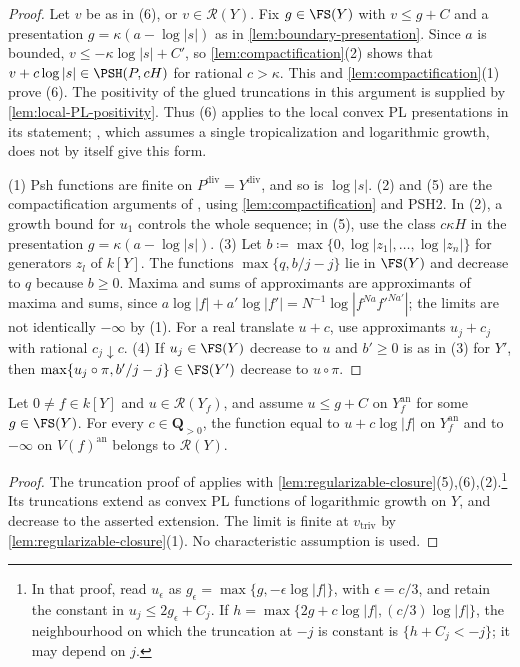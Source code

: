 \documentclass[11pt,a4paper]{article}
\newcommand{\an}{\mathrm{an}}          %
\newcommand{\divv}{\mathrm{div}}       %
\newcommand{\vtriv}{v_{\mathrm{triv}}} %
\begin{document}
\begin{proof}
Let $v$ be as in (6), or $v\in\mathcal{R}(Y)$. Fix $g\in\FS(Y)$ with $v\le g+C$ and a presentation $g=\kappa(a-\log|s|)$ as in \cref{lem:boundary-presentation}. Since $a$ is bounded, $v\le-\kappa\log|s|+C'$, so \cref{lem:compactification}(2) shows that $v+c\log|s|\in\PSH(P,cH)$ for rational $c>\kappa$. This and \cref{lem:compactification}(1) prove (6). The positivity of the glued truncations in this argument is supplied by \cref{lem:local-PL-positivity}. Thus (6) applies to the local convex PL presentations in its statement; \cite[Lemma~3.26]{Wu26}, which assumes a single tropicalization and logarithmic growth, does not by itself give this form.

(1) Psh functions are finite on $P^{\divv}=Y^{\divv}$, and so is $\log|s|$. (2) and (5) are the compactification arguments of \cite[Lemma~3.25(3),(2)]{Wu26}, using \cref{lem:compactification} and PSH2. In (2), a growth bound for $u_1$ controls the whole sequence; in (5), use the class $c\kappa H$ in the presentation $g=\kappa(a-\log|s|)$. (3) Let $b\coloneqq\max\{0,\log|z_1|,\ldots,\log|z_n|\}$ for generators $z_l$ of $k[Y]$. The functions $\max\{q,b/j-j\}$ lie in $\FS(Y)$ and decrease to $q$ because $b\ge0$. Maxima and sums of approximants are approximants of maxima and sums, since $a\log|f|+a'\log|f'|=N^{-1}\log|f^{Na}f'^{Na'}|$; the limits are not identically $-\infty$ by (1). For a real translate $u+c$, use approximants $u_j+c_j$ with rational $c_j\downarrow c$. (4) If $u_j\in\FS(Y)$ decrease to $u$ and $b'\ge0$ is as in (3) for $Y'$, then $\max\{u_j\circ\pi,b'/j-j\}\in\FS(Y')$ decrease to $u\circ\pi$.
\end{proof}

\begin{lemma}\label{lem:principal-extension}
Let $0\ne f\in k[Y]$ and $u\in\mathcal{R}(Y_f)$, and assume $u\le g+C$ on $Y_f^{\an}$ for some $g\in\FS(Y)$. For every $c\in\mathbf Q_{>0}$, the function equal to $u+c\log|f|$ on $Y_f^{\an}$ and to $-\infty$ on $V(f)^{\an}$ belongs to $\mathcal{R}(Y)$.
\end{lemma}

\begin{proof}
The truncation proof of \cite[Proposition~3.30]{Wu26} applies with \cref{lem:regularizable-closure}(5),(6),(2).\footnote{In that proof, read $u_\epsilon$ as $g_\epsilon=\max\{g,-\epsilon\log|f|\}$, with $\epsilon=c/3$, and retain the constant in $u_j\le2g_\epsilon+C_j$. If $h=\max\{2g+c\log|f|,(c/3)\log|f|\}$, the neighbourhood on which the truncation at $-j$ is constant is $\{h+C_j<-j\}$; it may depend on $j$.} Its truncations extend as convex PL functions of logarithmic growth on $Y$, and decrease to the asserted extension. The limit is finite at $\vtriv$ by \cref{lem:regularizable-closure}(1). No characteristic assumption is used.
\end{proof}
\end{document}
